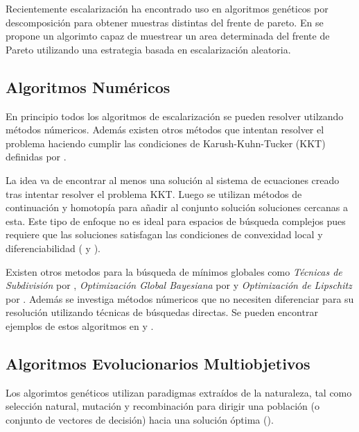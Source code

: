 Recientemente escalarizaci\'on ha encontrado uso en algoritmos gen\'eticos por descomposici\'on para obtener muestras distintas del frente de pareto.  En \cite{paria2020flexible} se propone un algorimto capaz de muestrear un area determinada del frente de Pareto utilizando una estrategia basada en escalarizaci\'on aleatoria.


\subsection{Algoritmos Num\'ericos}

En principio todos los algoritmos de escalarizaci\'on se pueden resolver utilzando m\'etodos n\'umericos. Adem\'as existen otros m\'etodos  que intentan resolver el problema haciendo cumplir las condiciones de Karush-Kuhn-Tucker (KKT) definidas por \cite{kuhn2014nonlinear}.

La idea va de encontrar al menos una soluci\'on al sistema de ecuaciones creado tras intentar resolver el problema KKT. Luego se utilizan m\'etodos de continuaci\'on y homotop\'ia para añadir al conjunto soluci\'on soluciones cercanas a esta. 
Este tipo de enfoque no es ideal para espacios de b\'usqueda complejos pues requiere que las soluciones satisfagan las condiciones de convexidad local y diferenciabilidad (\cite{hillermeier2001nonlinear} y \cite{schutze_et_al:DagSemProc.04461.16}).

Existen otros metodos para la b\'usqueda de m\'inimos globales como \textit{T\'ecnicas de Subdivisi\'on} por \cite{dellnitz2005covering}, \textit{Optimizaci\'on Global Bayesiana} por \cite{emmerich2016multicriteria} y \textit{Optimizaci\'on de Lipschitz} por \cite{vzilinskas2013worst}. %
Adem\'as  se investiga  m\'etodos n\'umericos que no necesiten diferenciar para su resoluci\'on utilizando t\'ecnicas de b\'usquedas directas. Se pueden encontrar ejemplos de estos algoritmos en \cite{custodio2011direct} y \cite{audet2010mesh}.

\subsection{Algoritmos Evolucionarios Multiobjetivos }

Los algorimtos gen\'eticos utilizan paradigmas extra\'idos de la naturaleza, tal como selecci\'on natural, mutaci\'on y recombinaci\'on para dirigir una poblaci\'on (o conjunto de vectores de decisi\'on) hacia una soluci\'on \'optima (\cite{back1996evolutionary}).

